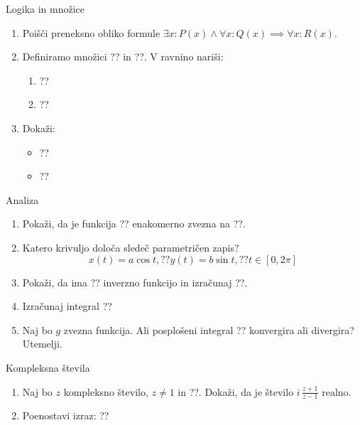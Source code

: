 \begin{frame}{Logika in množice}
	\begin{enumerate}
		\item
		Poišči preneksno obliko formule
		$\exists x: P(x) \land \forall x: Q(x) \implies \forall x: R(x)$.
		
		\item 
		Definiramo množici ?? in ??.
		V ravnino nariši:
		\begin{enumerate}
		   \item ??
		   \item ??
		\end{enumerate}
		\item
		Dokaži:
		\begin{itemize}
			\item ??
			\item ??
		\end{itemize}
	\end{enumerate}
\end{frame}

\begin{frame}{Analiza}
	\begin{enumerate}
		\item
		Pokaži, da je funkcija ?? enakomerno zvezna na ??.
		\item 
		Katero krivuljo določa sledeč parametričen zapis?
		$$
		   x(t) = a \cos t, ?? %
		   y(t) = b \sin t, ?? %
		   t \in [0, 2 \pi]
		$$ 
		\item
		Pokaži, da ima ?? inverzno funkcijo in izračunaj ??.
		
		\item
		Izračunaj integral 
		??
		\item 
		Naj bo $g$ zvezna funkcija. Ali posplošeni integral 
		??
		konvergira ali divergira? Utemelji.
	\end{enumerate}
\end{frame}

\begin{frame}{Kompleksna števila}
	\begin{enumerate}
		\item
		Naj bo $z$ kompleksno število, $z \ne 1$ in ??.
		Dokaži, da je število \( i \, \frac{z+1}{z-1} \) realno.
		\item
		Poenostavi izraz:
		??
	\end{enumerate}
\end{frame}